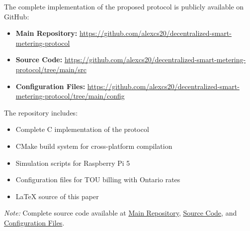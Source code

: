 \documentclass[conference]{IEEEtran}
\begin{document}
The complete implementation of the proposed protocol is publicly available on GitHub:

\begin{itemize}
\item \textbf{Main Repository:} \url{https://github.com/alexcs20/decentralized-smart-metering-protocol}
\item \textbf{Source Code:} \url{https://github.com/alexcs20/decentralized-smart-metering-protocol/tree/main/src}
\item \textbf{Configuration Files:} \url{https://github.com/alexcs20/decentralized-smart-metering-protocol/tree/main/config}
\end{itemize}

The repository includes:
\begin{itemize}
\item Complete C implementation of the protocol
\item CMake build system for cross-platform compilation
\item Simulation scripts for Raspberry Pi 5
\item Configuration files for TOU billing with Ontario rates
\item LaTeX source of this paper
\end{itemize}

\vspace{1em}
\noindent\textit{Note:} Complete source code available at 
\href{https://github.com/alexcs20/decentralized-smart-metering-protocol}{Main Repository}, 
\href{https://github.com/alexcs20/decentralized-smart-metering-protocol/tree/main/src}{Source Code}, 
and \href{https://github.com/alexcs20/decentralized-smart-metering-protocol/tree/main/config}{Configuration Files}.
\end{document}
